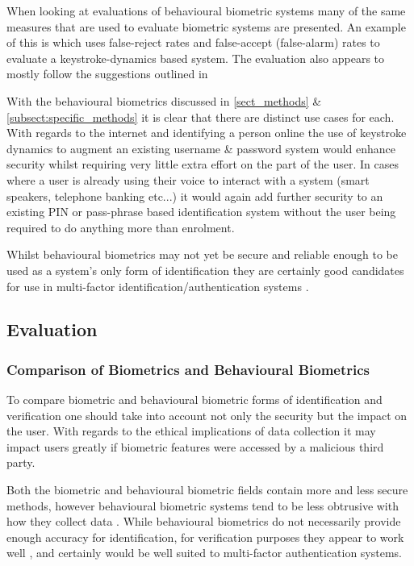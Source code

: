 \documentclass[12pt]{article}
\begin{document}
	When looking at evaluations of behavioural biometric systems many of the same measures that are used to evaluate biometric systems are presented. An example of this is \cite{typing_auth2005} which uses false-reject rates and false-accept (false-alarm) rates to evaluate a keystroke-dynamics based system. The evaluation also appears to mostly follow the suggestions outlined in \cite{phillips_evaluating_biometric_systems2000} 
	
	With the behavioural biometrics discussed in \ref{sect_methods} \& \ref{subsect:specific_methods} it is clear that there are distinct use cases for each. With regards to the internet and identifying a person online the use of keystroke dynamics to augment an existing username \& password system would enhance security whilst requiring very little extra effort on the part of the user. In cases where a user is already using their voice to interact with a system (smart speakers, telephone banking etc...) it would again add further security to an existing PIN or pass-phrase based identification system without the user being required to do anything more than enrolment.
	
	Whilst behavioural biometrics may not yet be secure and reliable enough to be used as a system's only form of identification they are certainly good candidates for use in multi-factor identification/authentication systems \citep{yampolskiy2008behavioural}.
	
	\subsection{Evaluation}
	\subsubsection{Comparison of Biometrics and Behavioural Biometrics}
	\label{subsubsect:biometric_behavioural_comparison}
	To compare biometric and behavioural biometric forms of identification and verification one should take into account not only the security but the impact on the user. With regards to the ethical implications of data collection it may impact users greatly if biometric features were accessed by a malicious third party. 
	
	Both the biometric and behavioural biometric fields contain more and less secure methods, however behavioural biometric systems tend to be less obtrusive with how they collect data \citep{yampolskiy2008behavioural}. While behavioural biometrics do not necessarily provide enough accuracy for identification, for verification purposes they appear to work well \citep{yampolskiy2008behavioural}, and certainly would be well suited to multi-factor authentication systems.
	
\end{document}
